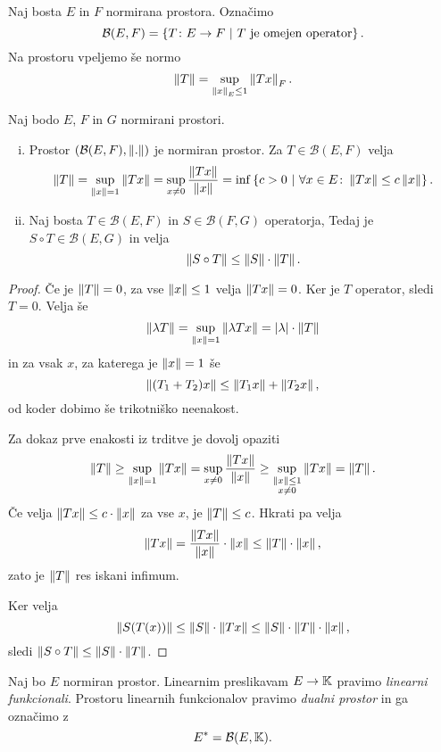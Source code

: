 \begin{definicija}
Naj bosta $E$ in $F$ normirana prostora. Označimo
\[
\mathcal{B}(E,F) =
\left\{T \colon E \to F~\middle\vert~\text{$T$ je omejen operator}\right\}.
\]
Na prostoru vpeljemo še normo
\[
\left\lVert T\right\rVert = \sup_{\left\lVert x\right\rVert_E \leq 1} \left\lVert Tx\right\rVert_F.
\]
\end{definicija}

\begin{trditev}
Naj bodo $E$, $F$ in $G$ normirani prostori.

\begin{enumerate}[i)]
\item Prostor $(\mathcal{B}(E,F), \left\lVert .\right\rVert)$ je normiran prostor.
Za $T \in \mathcal{B}(E,F)$ velja
\[
\left\lVert T\right\rVert =
\sup_{\left\lVert x\right\rVert=1} \left\lVert Tx\right\rVert =
\sup_{x \ne 0} \frac{\left\lVert Tx\right\rVert}{\left\lVert x\right\rVert} =
\inf \left\{c > 0~\middle\vert~\forall x \in E \colon \left\lVert Tx\right\rVert \leq c \left\lVert x\right\rVert\right\}.
\]
\item Naj bosta $T \in \mathcal{B}(E,F)$ in
$S \in \mathcal{B}(F,G)$ operatorja, Tedaj je
$S \circ T \in \mathcal{B}(E,G)$ in velja
\[
\left\lVert S \circ T\right\rVert \leq \left\lVert S\right\rVert \cdot \left\lVert T\right\rVert.
\]
\end{enumerate}
\end{trditev}


\begin{proof}
Če je $\left\lVert T\right\rVert = 0$, za vse $\left\lVert x\right\rVert \leq 1$ velja
$\left\lVert Tx\right\rVert = 0$. Ker je $T$ operator, sledi $T = 0$. Velja še
\[
\left\lVert \lambda T\right\rVert = \sup_{\left\lVert x\right\rVert=1} \left\lVert \lambda Tx\right\rVert =
\left\lvert \lambda\right\rvert \cdot \left\lVert T\right\rVert
\]
in za vsak $x$, za katerega je $\left\lVert x\right\rVert=1$ še
\[
\left\lVert (T_1 + T_2)x\right\rVert \leq \left\lVert T_1x\right\rVert + \left\lVert T_2x\right\rVert,
\]
od koder dobimo še trikotniško neenakost.

Za dokaz prve enakosti iz trditve je dovolj opaziti
\[
\left\lVert T\right\rVert \geq \sup_{\left\lVert x\right\rVert=1} \left\lVert Tx\right\rVert =
\sup_{x \ne 0} \frac{\left\lVert Tx\right\rVert}{\left\lVert x\right\rVert} \geq
\sup_{\substack{\left\lVert x\right\rVert \leq 1 \\ x \ne 0}} \left\lVert Tx\right\rVert = \left\lVert T\right\rVert.
\]
Če velja $\left\lVert Tx\right\rVert \leq c \cdot \left\lVert x\right\rVert$ za vse $x$, je
$\left\lVert T\right\rVert \leq c$. Hkrati pa velja
\[
\left\lVert Tx\right\rVert =
\frac{\left\lVert Tx\right\rVert}{\left\lVert x\right\rVert} \cdot \left\lVert x\right\rVert \leq
\left\lVert T\right\rVert \cdot \left\lVert x\right\rVert,
\]
zato je $\left\lVert T\right\rVert$ res iskani infimum.

Ker velja
\[
\left\lVert S(T(x))\right\rVert \leq \left\lVert S\right\rVert \cdot \left\lVert Tx\right\rVert \leq
\left\lVert S\right\rVert \cdot \left\lVert T\right\rVert \cdot \left\lVert x\right\rVert,
\]
sledi $\left\lVert S \circ T\right\rVert \leq \left\lVert S\right\rVert \cdot \left\lVert T\right\rVert$.
\end{proof}

\begin{definicija}
Naj bo $E$ normiran prostor. Linearnim preslikavam $E \to \mathbb{K}$
pravimo \emph{linearni funkcionali}.
Prostoru linearnih funkcionalov pravimo
\emph{dualni prostor} in ga
označimo z
\[
E^* = \mathcal{B}(E,\mathbb{K}).
\]
\end{definicija}

